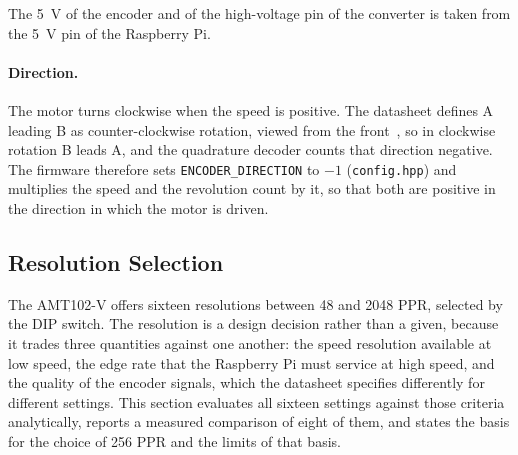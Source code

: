 The 5~V of the encoder and of the high-voltage pin of the converter is taken from the 5~V pin of the Raspberry Pi.
\paragraph{Direction.}
The motor turns clockwise when the speed is positive. The datasheet defines A leading B as counter-clockwise rotation, viewed from the front~\citep{sameskyamt10}, so in clockwise rotation B leads A, and the quadrature decoder counts that direction negative. The firmware therefore sets \texttt{ENCODER\_DIRECTION} to $-1$ (\texttt{config.hpp}) and multiplies the speed and the revolution count by it, so that both are positive in the direction in which the motor is driven.

\subsection{Resolution Selection}
\label{subsec:agit-ppr}

The AMT102-V offers sixteen resolutions between 48 and 2048 PPR, selected by the DIP switch. The resolution is a design decision rather than a given, because it trades three quantities against one another: the speed resolution available at low speed, the edge rate that the Raspberry Pi must service at high speed, and the quality of the encoder signals, which the datasheet specifies differently for different settings. This section evaluates all sixteen settings against those criteria analytically, reports a measured comparison of eight of them, and states the basis for the choice of 256 PPR and the limits of that basis.

